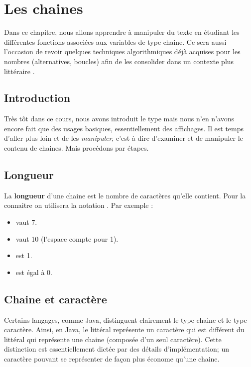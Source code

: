 \chapter{Les chaines}

	Dans ce chapitre, 
	nous allons apprendre à manipuler du texte 
	en étudiant les différentes fonctions associées 
	aux variables de type chaine. 
	Ce sera aussi l'occasion de revoir quelques techniques algorithmiques 
	déjà acquises pour les nombres (alternatives, boucles) 
	afin de les consolider dans un contexte plus \og littéraire \fg.
	
\section{Introduction}

	Très tôt dans ce cours,
	nous avons introduit le type 
	mais nous n'en n'avons encore fait que des usages basiques,
	essentiellement des affichages.
	Il est temps d'aller plus loin et de les \emph{manipuler},
	c'est-à-dire d'examiner et de manipuler le contenu de chaines. 
	Mais procédons par étapes.
	
\section{Longueur}
	
	La \textbf{longueur} d'une chaine est le nombre de caractères
	qu'elle contient. 
	Pour la connaitre on utilisera la notation .
	Par exemple :
	\begin{itemize}
	\item {} vaut 7.
	\item {} vaut 10 (l'espace compte pour 1).
	\item {} est 1.
	\item {} est égal à 0.
	\end{itemize}
	
\section{Chaine et caractère}

	Certains langages, comme Java,
	distinguent clairement le type chaine et le type caractère.
	Ainsi, en Java, le littéral  représente un caractère
	qui est différent du littéral  qui représente une chaine
	(composée d'un seul caractère).
	Cette distinction est essentiellement dictée par des détails
	d'implémentation; un caractère pouvant se représenter
	de façon plus économe qu'une chaine.

